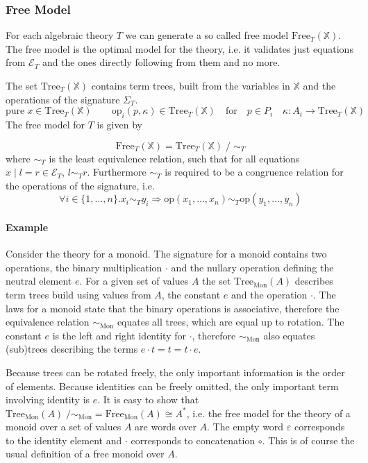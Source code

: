 \subsubsection{Free Model}

For each algebraic theory $T$ we can generate a so called free model
$\mathrm{Free}_T(\mathbb{X})$.
The free model is the optimal model for the theory, i.e. it validates just
equations from $\mathcal{E}_T$ and the ones directly following from them and no
more.

The set $\mathrm{Tree}_T(\mathbb{X})$ contains term trees, built from the
variables in $\mathbb{X}$ and the operations of the signature $\Sigma_T$.
\[
  \mathrm{pure}\;x \in \mathrm{Tree}_T(\mathbb{X}) \qquad \mathrm{op}_i(p,\kappa)
  \in \mathrm{Tree}_T(\mathbb{X}) \quad\text{for}\quad p\in P_i \quad \kappa :
  A_i \rightarrow \mathrm{Tree}_T(\mathbb{X})
\]
The free model for $T$ is given by

\[
  \mathrm{Free}_T(\mathbb{X}) = \mathrm{Tree}_T(\mathbb{X})\; /\;\sim_T
\]
where $\sim_T$ is the least equivalence relation, such that for all equations
$x\;|\;l=r\in\mathcal{E}_T$, $l\sim_T r$.
Furthermore $\sim_T$ is required to be a congruence relation for the operations
of the signature, i.e.
\[
  \forall i\in\{1,\dots ,n\}. x_i\sim_T y_i \Rightarrow \mathrm{op}(x_1,\dots , x_n)
  \sim_T \mathrm{op}(y_1,\dots , y_n)
\]

\paragraph{Example}

Consider the theory for a monoid.
The signature for a monoid contains two operations, the binary multiplication $\cdot$
and the nullary operation defining the neutral element $e$.
For a given set of values $A$ the set $\mathrm{Tree}_{\mathrm{Mon}}(A)$ describes term trees
build using values from $A$, the constant $e$ and the operation $\cdot$.
The laws for a monoid state that the binary operations is associative, therefore
the equivalence relation $\sim_{\mathrm{Mon}}$ equates all trees, which are
equal up to rotation.
The constant $e$ is the left and right identity for $\cdot$, therefore
$\sim_{\mathrm{Mon}}$ also equates (sub)trees describing the terms $e\cdot t = t
= t \cdot e$.

Because trees can be rotated freely, the only important information is the order
of elements.
Because identities can be freely omitted, the only important term involving
identity is $e$.
It is easy to show that $\mathrm{Tree}_{\mathrm{Mon}}(A)
\;/\sim_{\mathrm{Mon}} = \mathrm{Free}_{\mathrm{Mon}}(A) \cong A^*$, i.e. the
free model for the theory of a monoid over a set of values $A$ are words over
$A$.
The empty word $\varepsilon$ corresponds to the identity element and $\cdot$
corresponds to concatenation $\circ$.
This is of course the usual definition of a free monoid over $A$.


